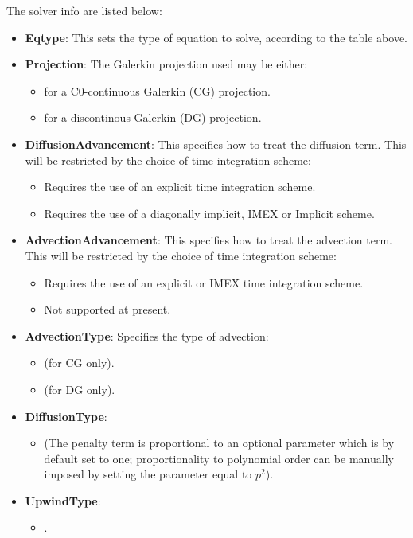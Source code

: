 The solver info are listed below:
\begin{itemize}
\item \textbf{Eqtype}: This sets the type of equation to solve, according to the table above.

\item \textbf{Projection}: The Galerkin projection used may be either:
\begin{itemize}
	\item {} for a C0-continuous Galerkin (CG) projection.
	\item {} for a discontinous Galerkin (DG) projection.
\end{itemize}
\item \textbf{DiffusionAdvancement}: This specifies how to treat the diffusion term. This will be restricted by the choice of time integration scheme:
\begin{itemize}
	\item {} Requires the use of an explicit time integration
	scheme.
	\item {} Requires the use of a diagonally implicit, IMEX or
	Implicit scheme.
\end{itemize}
\item \textbf{AdvectionAdvancement}: This specifies how to treat the advection term. This will be restricted by the choice of time integration scheme:
\begin{itemize}
	\item {} Requires the use of an explicit or IMEX time integration
	scheme.
	\item {} Not supported at present.
\end{itemize}
\item \textbf{AdvectionType}: Specifies the type of advection:
\begin{itemize}
	\item {} (for CG only).
	\item {} (for DG only).
\end{itemize}
\item \textbf{DiffusionType}:
\begin{itemize}
	\item {} (The penalty term is proportional to an optional parameter  which is by default set to one; proportionality to polynomial order can be manually imposed by setting the parameter  equal to $p^2$).
\end{itemize}
\item \textbf{UpwindType}:
\begin{itemize}
	\item {}.
\end{itemize}
\end{itemize}

